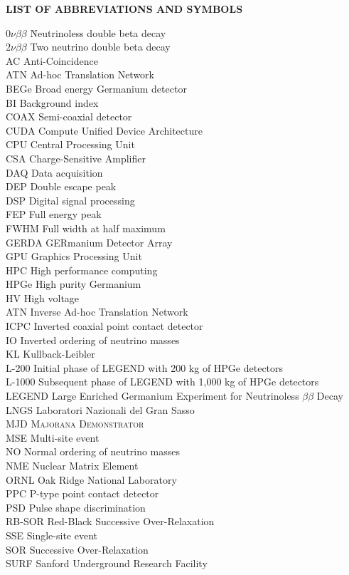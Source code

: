 {}

\begin{center}
{\normalfont \textbf{LIST OF ABBREVIATIONS AND SYMBOLS}}
\end{center}

\newcommand{\Ab}[2]{\noindent  #1 \> #2 \\}
\newcommand{\Abi}[2]{\noindent #1 \hspace{1.5cm} \= #2 \\}

\begin{tabbing}
\Abi{$0\nu\beta\beta$}{Neutrinoless double beta decay}
\Ab{$2\nu\beta\beta$}{Two neutrino double beta decay}
\Ab{AC}{Anti-Coincidence}
\Ab{ATN}{Ad-hoc Translation Network}
\Ab{BEGe}{Broad energy Germanium detector}
\Ab{BI}{Background index}
\Ab{COAX}{Semi-coaxial detector}
\Ab{CUDA} {Compute Unified Device Architecture}
\Ab{CPU}{Central Processing Unit}
\Ab{CSA} {Charge-Sensitive Amplifier}
\Ab{DAQ}{Data acquisition}
\Ab{DEP}{Double escape peak}
\Ab{DSP}{Digital signal processing}
\Ab{FEP}{Full energy peak}
\Ab{FWHM}{Full width at half maximum}
\Ab{GERDA}{GERmanium Detector Array}
\Ab{GPU}{Graphics Processing Unit}
\Ab{HPC}{High performance computing}
\Ab{HPGe}{High purity Germanium}
\Ab{HV}{High voltage}
\Ab{ATN}{Inverse Ad-hoc Translation Network}
\Ab{ICPC}{Inverted coaxial point contact detector}
\Ab{IO}{Inverted ordering of neutrino masses}
\Ab{KL}{Kullback-Leibler} 
\Ab{L-200}{Initial phase of LEGEND with 200 kg of HPGe detectors}
\Ab{L-1000}{Subsequent phase of LEGEND with 1,000 kg of HPGe detectors}
\Ab{LEGEND}{Large Enriched Germanium Experiment for Neutrinoless $\beta\beta$ Decay}
\Ab{LNGS}{Laboratori Nazionali del Gran Sasso}
\Ab{MJD}{\textsc{Majorana Demonstrator}}
\Ab{MSE}{Multi-site event}
\Ab{NO}{Normal ordering of neutrino masses}
\Ab{NME}{Nuclear Matrix Element}
\Ab{ORNL}{Oak Ridge National Laboratory}
\Ab{PPC}{P-type point contact detector}
\Ab{PSD}{Pulse shape discrimination}
\Ab{RB-SOR} {Red-Black Successive Over-Relaxation}
\Ab{SSE}{Single-site event}
\Ab{SOR} {Successive Over-Relaxation}
\Ab{SURF}{Sanford Underground Research Facility}
\end{tabbing}

\clearpage
